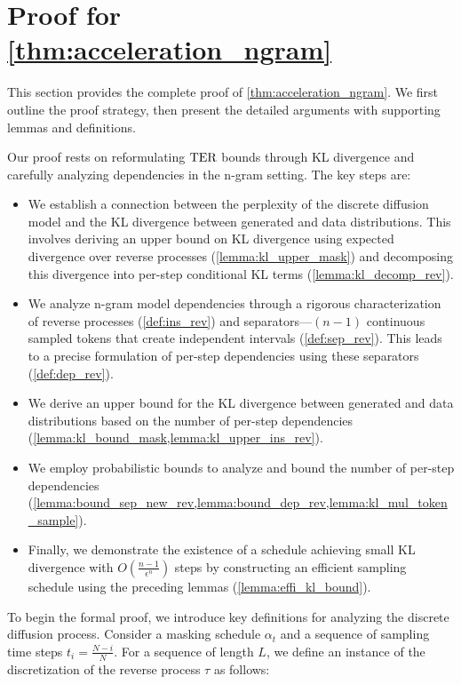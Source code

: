 \section{Proof for \cref{thm:acceleration_ngram}}
\label{app:positive}

This section provides the complete proof of \cref{thm:acceleration_ngram}. We first outline the proof strategy, then present the detailed arguments with supporting lemmas and definitions.

Our proof rests on reformulating $\operatorname{TER}$ bounds through KL divergence and carefully analyzing dependencies in the n-gram setting. The key steps are:
\begin{itemize}
    \item We establish a connection between the perplexity of the discrete diffusion model and the KL divergence between generated and data distributions. This involves deriving an upper bound on KL divergence using expected divergence over reverse processes (\cref{lemma:kl_upper_mask}) and decomposing this divergence into per-step conditional KL terms (\cref{lemma:kl_decomp_rev}).
    \item We analyze n-gram model dependencies through a rigorous characterization of reverse processes (\cref{def:ins_rev}) and separators—$(n-1)$ continuous sampled tokens that create independent intervals (\cref{def:sep_rev}). This leads to a precise formulation of per-step dependencies using these separators (\cref{def:dep_rev}).
    \item We derive an upper bound for the KL divergence between generated and data distributions based on the number of per-step dependencies (\cref{lemma:kl_bound_mask,lemma:kl_upper_ins_rev}).
    \item We employ probabilistic bounds to analyze and bound the number of per-step dependencies (\cref{lemma:bound_sep_new_rev,lemma:bound_dep_rev,lemma:kl_mul_token_sample}).
    \item Finally, we demonstrate the existence of a schedule achieving small KL divergence with $O(\frac{n-1}{\epsilon^n})$ steps by constructing an efficient sampling schedule using the preceding lemmas (\cref{lemma:effi_kl_bound}).
\end{itemize}






To begin the formal proof, we introduce key definitions for analyzing the discrete diffusion process. Consider a masking schedule $\alpha_t$ and a sequence of sampling time steps $t_i = \frac{N-i}{N}$. For a sequence of length $L$, we define an instance of the discretization of the reverse process $\tau$ as follows:

